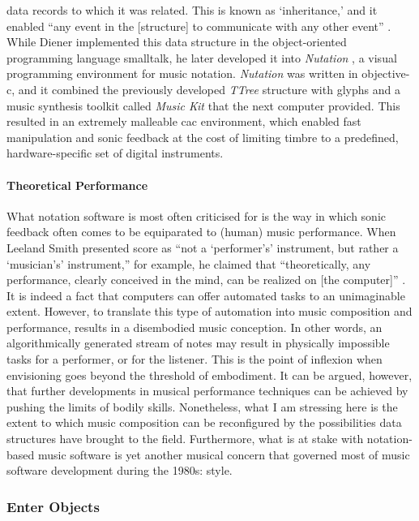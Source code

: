 data records to which it was related. This is known as `inheritance,' and it enabled ``any event in the [structure] to communicate with any other event'' \parencite[188]{icmc/bbp2372.1988.020}. While Diener implemented this data structure in the object-oriented programming language \gls{smalltalk}, he later developed it into \textit{Nutation} \parencite{DBLP:conf/icmc/Diener92}, a visual programming environment for music notation. \textit{Nutation} was written in \gls{objective-c}, and it combined the previously developed \textit{TTree} structure with glyphs and a music synthesis toolkit called \textit{Music Kit} that the \gls{next} computer provided. This resulted in an extremely malleable \gls{cac} environment, which enabled fast manipulation and sonic feedback at the cost of limiting timbre to a predefined, hardware-specific set of digital instruments. 

\paragraph{Theoretical Performance}
What notation software is most often criticised for is the way in which sonic feedback often comes to be equiparated to (human) music performance. When Leeland Smith presented \gls{score} as ``not a `performer's' instrument, but rather a `musician's' instrument,'' for example, he claimed that ``theoretically, any performance, clearly conceived in the mind, can be realized on [the computer]'' \parencite[14]{smith1971}. It is indeed a fact that computers can offer automated tasks to an unimaginable extent. However, to translate this type of automation into music composition and performance, results in a disembodied music conception. In other words, an algorithmically generated stream of notes may result in physically impossible tasks for a performer, or for the listener. This is the point of inflexion when envisioning goes beyond the threshold of embodiment. It can be argued, however, that further developments in musical performance techniques can be achieved by pushing the limits of bodily skills. Nonetheless, what I am stressing here is the extent to which music composition can be reconfigured by the possibilities data structures have brought to the field. Furthermore, what is at stake with notation-based music software is yet another musical concern that governed most of music software development during the 1980s: style.

\subsubsection{Enter Objects}

